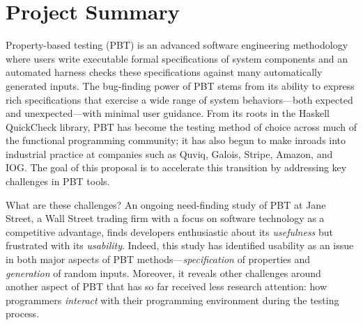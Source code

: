 \section*{Project Summary}


\newcommand{\summarysection}[1]{\medskip \noindent {\bf #1.}}


\summarysection{Overview}
Property-based testing (PBT) is an advanced software engineering
methodology where users write executable formal specifications of system
components
and an automated harness checks these specifications against
many automatically generated inputs.  The bug-finding power of PBT
stems from its ability to express rich specifications that
exercise a wide range of system behaviors---both
expected and unexpected---with minimal user guidance.
%
From its roots in the Haskell QuickCheck library, PBT has become
the testing method of choice across much of the functional programming
community; it has also begun to make inroads into industrial practice
at companies such as Quviq, Galois, Stripe, Amazon, and IOG.
%
The goal of this proposal is to accelerate this transition
by addressing key challenges in
PBT tools.

What are these challenges? \iflater{}\fi
An ongoing need-finding study of PBT at Jane
Street, a Wall Street trading firm with a focus on software
technology as a competitive advantage, finds developers enthusiastic
about its {\em usefulness} but frustrated with its {\em usability}.
%
Indeed, this study has identified usability as an issue in both major aspects
of PBT methods---{\em specification} of properties and {\em
  generation} of random inputs. Moreover, it reveals other challenges
around another aspect of PBT that has so far received less research
attention: how programmers {\em interact} with their programming
environment during the testing process.

